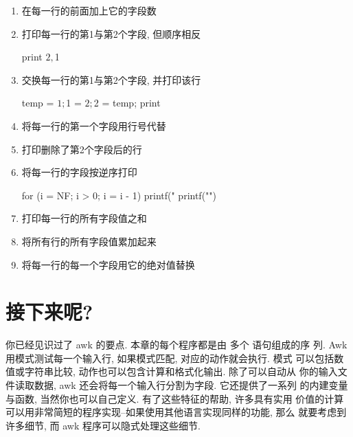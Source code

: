 \begin{enumerate}
\begin{awkcode}
    $NF > 0
\end{awkcode}
\item 打印长度超过80个字符的行
\begin{awkcode}
    length($0) > 80
\end{awkcode}
\item 在每一行的前面加上它的字段数
\item 打印每一行的第1与第2个字段, 但顺序相反
\begin{awkcode}
    { print $2, $1 }
\end{awkcode}
\item 交换每一行的第1与第2个字段, 并打印该行
\begin{awkcode}
    { temp = $1; $1 = $2; $2 = temp; print }
\end{awkcode}
\item 将每一行的第一个字段用行号代替
\item 打印删除了第2个字段后的行
\item 将每一行的字段按逆序打印
\begin{awkcode}
    { for (i = NF; i > 0; i = i - 1) printf("%
      printf("\n")
    }
\end{awkcode}
\item 打印每一行的所有字段值之和
\item 将所有行的所有字段值累加起来
\item 将每一行的每一个字段用它的绝对值替换
\end{enumerate}

\section{接下来呢?}
\label{sec:what_next}
你已经见识过了 awk 的要点. 本章的每个程序都是由
多个 \patact 语句组成的序
列. Awk 用模式测试每一个输入行, 如果模式匹配, 对应的动作就会执行. 模式
可以包括数值或字符串比较, 动作也可以包含计算和格式化输出. 除了可以自动从
你的输入文件读取数据, awk 还会将每一个输入行分割为字段. 它还提供了一系列
的内建变量与函数, 当然你也可以自己定义. 有了这些特征的帮助, 许多具有实用
价值的计算可以用非常简短的程序实现--如果使用其他语言实现同样的功能, 那么
就要考虑到许多细节, 而 awk 程序可以隐式处理这些细节.

